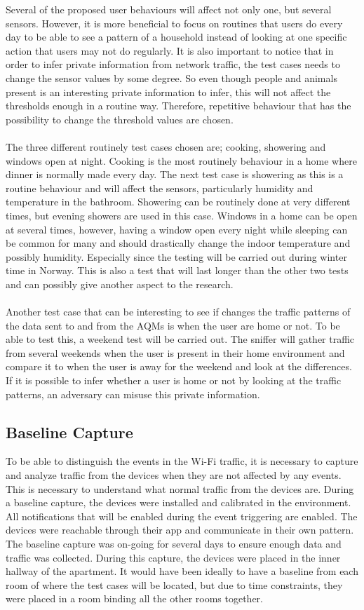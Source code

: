 Several of the proposed user behaviours will affect not only one, but several sensors. However, it is more beneficial to focus on routines that users do every day to be able to see a pattern of a household instead of looking at one specific action that users may not do regularly. It is also important to notice that in order to infer private information from network traffic, the test cases needs to change the sensor values by some degree. So even though people and animals present is an interesting private information to infer, this will not affect the thresholds enough in a routine way. Therefore, repetitive behaviour that has the possibility to change the threshold values are chosen. 
\\\\
The three different routinely test cases chosen are; cooking, showering and windows open at night. Cooking is the most routinely behaviour in a home where dinner is normally made every day. The next test case is showering as this is a routine behaviour and will affect the sensors, particularly humidity and temperature in the bathroom. Showering can be routinely done at very different times, but evening showers are used in this case. Windows in a home can be open at several times, however, having a window open every night while sleeping can be common for many and should drastically change the indoor temperature and possibly humidity. Especially since the testing will be carried out during winter time in Norway. This is also a test that will last longer than the other two tests and can possibly give another aspect to the research. 
\\\\
Another test case that can be interesting to see if changes the traffic patterns of the data sent to and from the AQMs is when the user are home or not. To be able to test this, a weekend test will be carried out. The sniffer will gather traffic from several weekends when the user is present in their home environment and compare it to when the user is away for the weekend and look at the differences. If it is possible to infer whether a user is home or not by looking at the traffic patterns, an adversary can misuse this private information. 

\subsection{Baseline Capture}
To be able to distinguish the events in the Wi-Fi traffic, it is necessary to capture and analyze traffic from the devices when they are not affected by any events. This is necessary to understand what normal traffic from the devices are. During a baseline capture, the devices were installed and calibrated in the environment. All notifications that will be enabled during the event triggering are enabled. The devices were reachable through their app and communicate in their own pattern. The baseline capture was on-going for several days to ensure enough data and traffic was collected. During this capture, the devices were placed in the inner hallway of the apartment. It would have been ideally to have a baseline from each room of where the test cases will be located, but due to time constraints, they were placed in a room binding all the other rooms together. 


